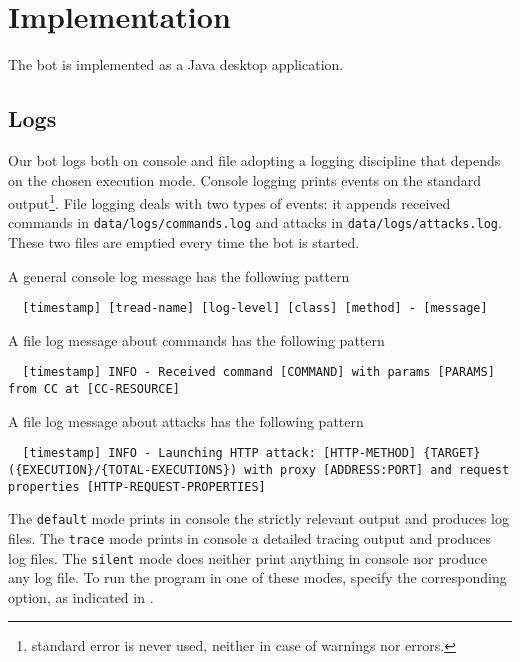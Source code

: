 \section{Implementation}
\label{sec:implementation}

The bot is implemented as a Java desktop application.

\textcolor{blue}{\lipsum[1]}

\subsection{Logs}
\label{sec:logs}

Our bot logs both on console and file adopting a logging discipline that depends on the chosen execution mode.
Console logging prints events on the standard output\footnote{standard error is never used, neither in case of warnings nor errors.}.
File logging deals with two types of events: it appends received commands in \texttt{data/logs/commands.log} and attacks in \texttt{data/logs/attacks.log}. These two files are emptied every time the bot is started.

A general console log message has the following pattern

\begin{verbatim}
  [timestamp] [tread-name] [log-level] [class] [method] - [message]
\end{verbatim}

A file log message about commands has the following pattern

\begin{verbatim}
  [timestamp] INFO - Received command [COMMAND] with params [PARAMS] from CC at [CC-RESOURCE]
\end{verbatim}

A file log message about attacks has the following pattern

\begin{verbatim}
  [timestamp] INFO - Launching HTTP attack: [HTTP-METHOD] {TARGET} ({EXECUTION}/{TOTAL-EXECUTIONS}) with proxy [ADDRESS:PORT] and request properties [HTTP-REQUEST-PROPERTIES]
\end{verbatim}


The \texttt{default} mode prints in console the strictly relevant output and produces log files. The \texttt{trace} mode prints in console a detailed tracing output and produces log files. The \texttt{silent} mode does neither print anything in console nor produce any log file.
To run the program in one of these modes, specify the corresponding option, as indicated in .


